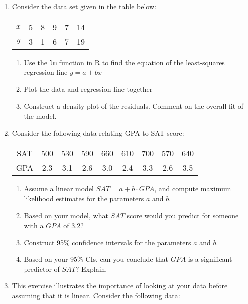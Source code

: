 \documentclass[10pt]{article}
\begin{document}
\begin{enumerate}

\item Consider the data set given in the table below:

  \begin{table}[h!]
    \centering
    \begin{tabular}{cccccc}
      \hline
      $x$ & 5 & 8 & 9 & 7 & 14\\
      $y$ & 3 & 1 & 6 & 7 & 19\\
      \hline
    \end{tabular}
  \end{table}
  \begin{enumerate}
  \item Use the \verb|lm| function in R to find the equation of the least-squares regression line $y=a+bx$
  \item Plot the data and regression line together
    \item Construct a density plot of the residuals.  Comment on the overall fit of the model.
  \end{enumerate}


\item Consider the following data relating GPA to SAT score:
\begin{table}[h!]
    \centering
    \begin{tabular}{ccccccccc}
      \hline
      SAT & 500 & 530 & 590 & 660 & 610 & 700 & 570 & 640\\
      GPA & 2.3 & 3.1 & 2.6 & 3.0 & 2.4 & 3.3 & 2.6 & 3.5\\
      \hline
    \end{tabular}
  \end{table}
  \begin{enumerate}
  \item Assume a linear model $SAT = a+b\cdot GPA$, and compute maximum likelihood estimates for the parameters $a$ and $b$.
  \item Based on your model, what $SAT$ score would you predict for someone with a $GPA$ of 3.2?
  \item Construct 95\% confidence intervals for the parameters $a$ and $b$.
    \item Based on your 95\% CIs, can you conclude that $GPA$ is a significant predictor of $SAT$?  Explain.
  \end{enumerate}
  

\item This exercise illustrates the importance of looking at your data before assuming that it is linear.  Consider the following data:


\end{enumerate}
\end{document}

